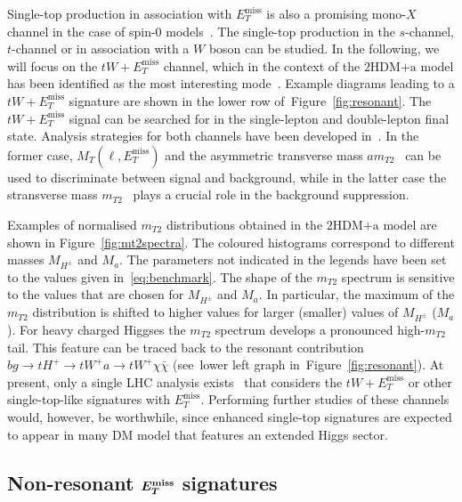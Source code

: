 \documentclass[review]{elsarticle}
\newcommand{\MET}{\ensuremath{E_T^\mathrm{miss}}\xspace}
\newcommand{\ma}{\ensuremath{M_{a}}\xspace}
\newcommand{\mHc}{\ensuremath{M_{H^{\pm}}}\xspace}
\newcommand{\hdma}{\ensuremath{\textrm{2HDM+a}}\xspace}
\def\bm#1{\mbox{\boldmath$#1$\unboldmath}}
\begin{document}
Single-top production in association with $\MET$ is also a promising mono-$X$ channel in the case of spin-0 models~\cite{Pinna:2017tay,Pani:2017qyd,Plehn:2017bys,Haisch:2018bby}. The single-top production in the $s$-channel, $t$-channel  or  in association with a $W$ boson can be studied. In the following, we will focus on the $tW + \MET$ channel, which in the context of the \hdma model has been identified as the most interesting mode~\cite{Pani:2017qyd}. Example diagrams leading to a $tW + \MET$ signature are shown in the lower row of~Figure~\ref{fig:resonant}. The $tW + \MET$ signal can be searched for in the single-lepton and double-lepton final state. Analysis strategies for both channels have been developed in~\cite{Pani:2017qyd}. In the former case, $M_T (\ell, \MET)$ and the asymmetric transverse mass $am_{T2}$~\cite{Konar:2009qr,Lester:2014yga} can be used to discriminate between signal and background, while in the latter case the stransverse mass $m_{T2}$~\cite{Lester:1999tx,Barr:2003rg} plays a crucial role in the background suppression.

Examples of normalised $m_{T2}$ distributions obtained in the \hdma model are shown in Figure~\ref{fig:mt2spectra}. The coloured histograms correspond to different masses $\mHc$ and $\ma$. The parameters not indicated in the legends have been set to the values given in~\eqref{eq:benchmark}. The shape of the $m_{T2}$ spectrum is sensitive to the values that are chosen for $\mHc$ and $\ma$. In particular, the maximum of the $m_{T2}$ distribution is shifted to higher values for larger (smaller) values of $\mHc$ ($\ma$). For heavy charged Higgses the $m_{T2}$ spectrum develops a pronounced high-$m_{T2}$ tail.  This feature can be traced back to the resonant contribution $b g \to t H^+  \to  t W^+ a  \to t W^+ \chi \bar \chi$ (see~lower left graph in~Figure~\ref{fig:resonant}).  At present, only a single LHC analysis exists~\cite{Sirunyan:2019gfm}  that considers the $tW + \MET$  or other single-top-like signatures with $\MET$. Performing further studies of these channels would, however, be worthwhile, since enhanced single-top signatures are expected to appear in many DM model that features an extended Higgs sector. 

\subsection[Non-resonant $E_T^{\rm miss}$ signatures]{Non-resonant $\bm{E_T^{\rm miss}}$ signatures}
\label{sec:nonresonant}
\end{document}
